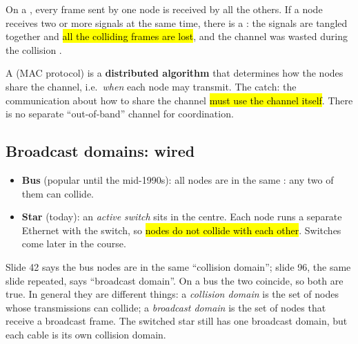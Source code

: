\begin{defn}
On a , every frame sent by one node is received by all the others. If a node receives two or more signals at the
same time, there is a : the signals are tangled together and \hl{all the colliding frames are lost}, and the channel was wasted during the collision .
\end{defn}

\begin{defn}
A  (MAC protocol) is a \textbf{distributed algorithm} that determines how the nodes share the channel, i.e.\ \emph{when} each node may transmit.
The catch: the communication about how to share the channel \hl{must use the channel itself}. There is no separate ``out-of-band'' channel for coordination.
\end{defn}

\subsection{Broadcast domains: wired}


\begin{itemize}
  \item \textbf{Bus} (popular until the mid-1990s): all nodes are in the same : any two of them can collide.
  \item \textbf{Star} (today): an \emph{active switch} sits in the centre. Each node runs a separate Ethernet with the switch, so \hl{nodes do not collide with each other}. Switches come later in the course.
\end{itemize}

\begin{pitfall}
Slide 42 says the bus nodes are in the same ``collision domain''; slide 96, the same slide repeated, says ``broadcast domain''. On a bus the two coincide, so both are true.
In general they are different things: a \emph{collision domain} is the set of nodes whose transmissions can collide; a \emph{broadcast domain} is the set
of nodes that receive a broadcast frame. The switched star still has one broadcast domain, but each cable is its own collision domain.
\end{pitfall}

